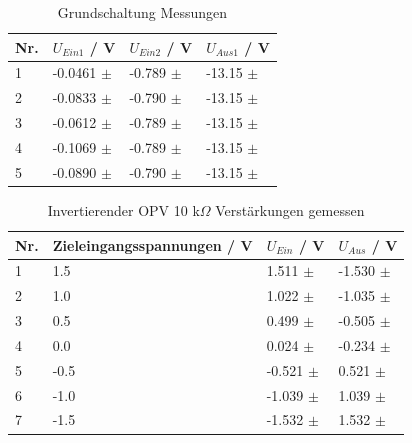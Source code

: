 \documentclass[12pt,a4paper,twoside]{article}
\begin{document}
\begin{table}[H]
    \centering
    \caption{Grundschaltung Messungen}
    \label{tab:GrundschaltungMessungen}
    \begin{tabular}{| l | l | l | l |}
        \hline
        Nr. & $U_{Ein1}$ / V & $U_{Ein2}$ / V & $U_{Aus1}$ / V \\
        \hline
        1 & -0.0461 $\pm$  & -0.789 $\pm$  & -13.15 $\pm$  \\
        2 & -0.0833 $\pm$  & -0.790 $\pm$  & -13.15 $\pm$  \\
        3 & -0.0612 $\pm$  & -0.789 $\pm$  & -13.15 $\pm$  \\
        4 & -0.1069 $\pm$  & -0.789 $\pm$  & -13.15 $\pm$  \\
        5 & -0.0890 $\pm$  & -0.790 $\pm$  & -13.15 $\pm$  \\
        \hline
    \end{tabular}
\end{table}

\begin{table}[H]
    \centering
    \caption{Invertierender OPV 10 k$\Omega$ Verstärkungen gemessen}
    \label{tab:IoVerstärkungenGemessen10}
    \begin{tabular}{| l | l | l | l |}
        \hline
        Nr. & Zieleingangsspannungen / V & $U_{Ein}$ / V & $U_{Aus}$ / V \\
        \hline
        1 &  1.5 &  1.511 $\pm$  & -1.530 $\pm$  \\
        2 &  1.0 &  1.022 $\pm$  & -1.035 $\pm$  \\
        3 &  0.5 &  0.499 $\pm$  & -0.505 $\pm$  \\
        4 &  0.0 &  0.024 $\pm$  & -0.234 $\pm$  \\
        5 & -0.5 & -0.521 $\pm$  &  0.521 $\pm$  \\
        6 & -1.0 & -1.039 $\pm$  &  1.039 $\pm$  \\
        7 & -1.5 & -1.532 $\pm$  &  1.532 $\pm$  \\
        \hline
    \end{tabular}
\end{table}
\end{document}
